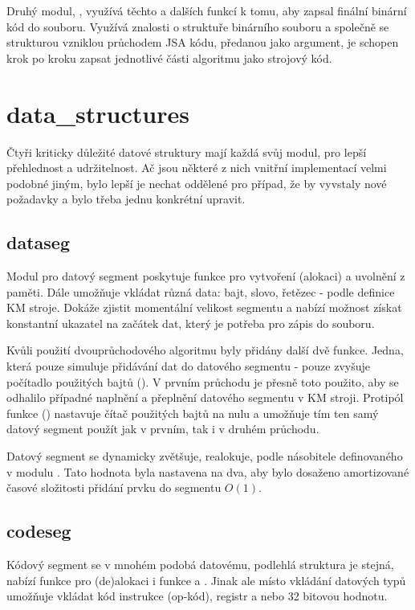 \documentclass[czech, kiv, he, sem, pdf, viewonly]{fasthesis}
\begin{document}
Druhý modul, , využívá těchto a dalších funkcí k tomu, aby
zapsal finální binární kód do souboru. Využívá znalosti o struktuře binárního
souboru a společně se strukturou vzniklou průchodem JSA kódu, předanou jako
argument, je schopen krok po kroku zapsat jednotlivé části algoritmu jako
strojový kód.

\section{data\_structures}

Čtyři kriticky důležité datové struktury mají každá svůj modul, pro lepší
přehlednost a udržitelnost. Ač jsou některé z nich vnitřní implementací velmi
podobné jiným, bylo lepší je nechat oddělené pro případ, že by vyvstaly nové
požadavky a bylo třeba jednu konkrétní upravit.

\subsection{dataseg}

Modul pro datový segment poskytuje funkce pro vytvoření (alokaci) a uvolnění z
paměti. Dále umožňuje vkládat různá data: bajt, slovo, řetězec - podle definice
KM stroje. Dokáže zjistit momentální velikost segmentu a nabízí možnost získat
konstantní ukazatel na začátek dat, který je potřeba pro zápis do souboru.

Kvůli použití dvouprůchodového algoritmu byly přidány další dvě funkce. Jedna,
která pouze simuluje přidávání dat do datového segmentu - pouze zvyšuje
počítadlo použitých bajtů (). V prvním průchodu je přesně toto
použito, aby se odhalilo případné naplnění a přeplnění datového segmentu v KM
stroji. Protipól funkce () nastavuje čítač použitých bajtů na
nulu a umožňuje tím ten samý datový segment použít jak v prvním, tak i v druhém
průchodu.

Datový segment se dynamicky zvětšuje, realokuje, podle násobitele definovaného v
modulu . Tato hodnota byla nastavena na dva, aby bylo dosaženo
amortizované časové složitosti přidání prvku do segmentu $O(1)$.

\subsection{codeseg}

Kódový segment se v mnohém podobá datovému, podlehlá struktura je stejná, nabízí
funkce pro (de)alokaci i funkce  a . Jinak ale
místo vkládání datových typů umožňuje vkládat kód instrukce (op-kód), registr a
nebo 32 bitovou hodnotu.
\end{document}
